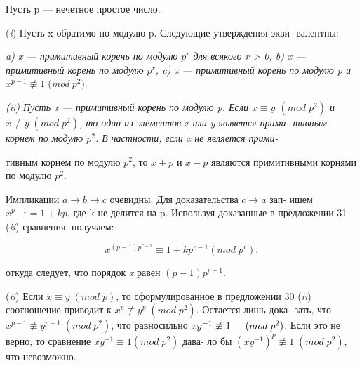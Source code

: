 \documentclass{../template/mai_book}
\begin{document}
\begin{thm}
\slshape{Пусть p --- нечетное простое число. \par 
(\textit{i}) Пусть x обратимо по модулю p. Следующие утверждения экви- \linebreak валентны: \linebreak}
\indent \slshape{a) x --- примитивный корень по модулю $p^{r}$ для всякого r > 0, \linebreak \indent b)\; x --- примитивный корень по модулю $p^{r}$, \linebreak \indent c) x --- примитивный корень по модулю p и $x^{p-1} \not\equiv 1 \; ($mod$ \; p^{2}).$ } \par 
\slshape{(\textit{ii}) Пусть x --- примитивный корень по модулю p. Если $x\equiv y$ 
\linebreak $(mod \; p^{2})$ и $x \not\equiv y \; (mod \; p^{2})$, то один из элементов x или y является прими- \linebreak тивным корнем по модулю $p^{2}$. В частности, если x не является прими- } \linebreak \newpage


\noindent тивным корнем по модулю $p^{2}$, то $x+p$ и $x-p$ являются примитивными корнями по модулю $p^{2}$. 
\end{thm}
 \begin{myproof}
Импликации $a \rightarrow b \rightarrow c$ очевидны. Для доказательства $c \rightarrow a$ зап- \linebreak \indent ишем $x^{p-1} = 1 + kp$, где k не делится на p. Используя доказанные в \linebreak \indent предложении 31 (\textit{ii}) сравнения, получаем: \par 
$$x^{(p-1)p^{r-2}} \equiv 1 + kp^{r-1} (mod \; p^{r}),$$ \par 
\indent откуда следует, что порядок \textit{x} равен $(p-1)p^{r-1}$. \par 
\indent (\textit{ii}) Если $x \equiv y \; (mod \; p)$, то сформулированное в предложении 30 (\textit{ii}) \linebreak \indent соотношение приводит к $x^{p} \not\equiv y^{p} \; (mod \; p^{2})$. Остается лишь дока- \linebreak \indent зать, что $x^{p-1} \not\equiv y^{p-1} \; (mod \; p^{2})$, что равносильно $xy^{-1} \not\equiv 1 \linebreak \indent (mod \; p^{2})$. Если это не верно, то сравнение $xy^{-1} \equiv
1(mod \; p^{2})$ дава- \linebreak \indent ло бы $(xy^{-1})^{p} \not\equiv 1 \; (mod \; p^{2})$, что невозможно.
\end{myproof}
\end{document}
